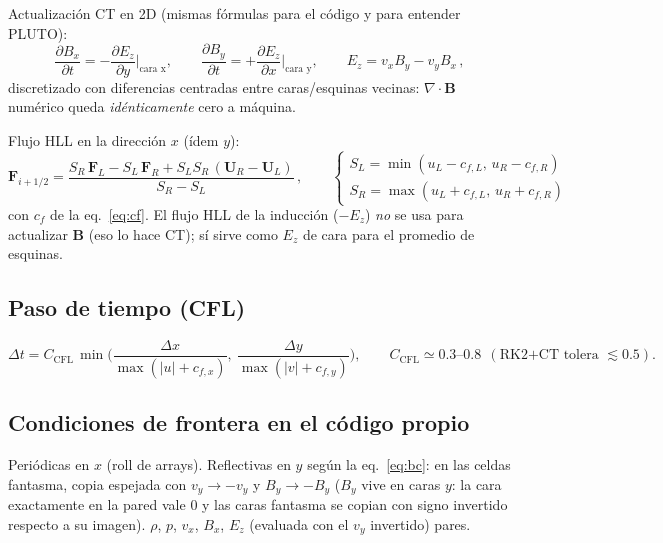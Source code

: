 \documentclass[11pt,a4paper]{article}
\newcommand{\B}{\mathbf{B}}
\begin{document}
Actualización CT en 2D (mismas fórmulas para el código y para entender PLUTO):
\begin{equation}
\frac{\partial B_x}{\partial t} = -\frac{\partial E_z}{\partial y}\Big|_\text{cara x},
\qquad
\frac{\partial B_y}{\partial t} = +\frac{\partial E_z}{\partial x}\Big|_\text{cara y},
\qquad E_z = v_x B_y - v_y B_x\,,
\label{eq:ct}
\end{equation}
discretizado con diferencias centradas entre caras/esquinas vecinas: $\nabla\cdot\B$
numérico queda \emph{idénticamente} cero a máquina.

Flujo HLL en la dirección $x$ (ídem $y$):
\begin{equation}
\mathbf{F}_{i+1/2} =
\frac{S_R\,\mathbf{F}_L - S_L\,\mathbf{F}_R + S_L S_R\,(\mathbf{U}_R-\mathbf{U}_L)}{S_R-S_L}\,,
\qquad
\begin{cases}
S_L=\min(u_L-c_{f,L},\,u_R-c_{f,R})\\
S_R=\max(u_L+c_{f,L},\,u_R+c_{f,R})
\end{cases}
\label{eq:hll}
\end{equation}
con $c_f$ de la eq.~\eqref{eq:cf}. El flujo HLL de la inducción ($-E_z$) \emph{no} se usa para
actualizar $\B$ (eso lo hace CT); sí sirve como $E_z$ de cara para el promedio de esquinas.

\subsection{Paso de tiempo (CFL)}

\begin{equation}
\Delta t = C_\mathrm{CFL}\,
\min\!\Big(\frac{\Delta x}{\max(|u|+c_{f,x})},\ \frac{\Delta y}{\max(|v|+c_{f,y})}\Big),
\qquad C_\mathrm{CFL}\simeq 0.3\text{--}0.8\ \ (\text{RK2+CT tolera } \lesssim 0.5).
\end{equation}

\subsection{Condiciones de frontera en el código propio}
\label{sec:python-bc}

Periódicas en $x$ (roll de arrays). Reflectivas en $y$ según la eq.~\eqref{eq:bc}:
en las celdas fantasma, copia espejada con $v_y\to-v_y$ y $B_y\to-B_y$
($B_y$ vive en caras $y$: la cara exactamente en la pared vale $0$ y las caras fantasma se
copian con signo invertido respecto a su imagen). $\rho$, $p$, $v_x$, $B_x$, $E_z$
(evaluada con el $v_y$ invertido) pares.
\end{document}
